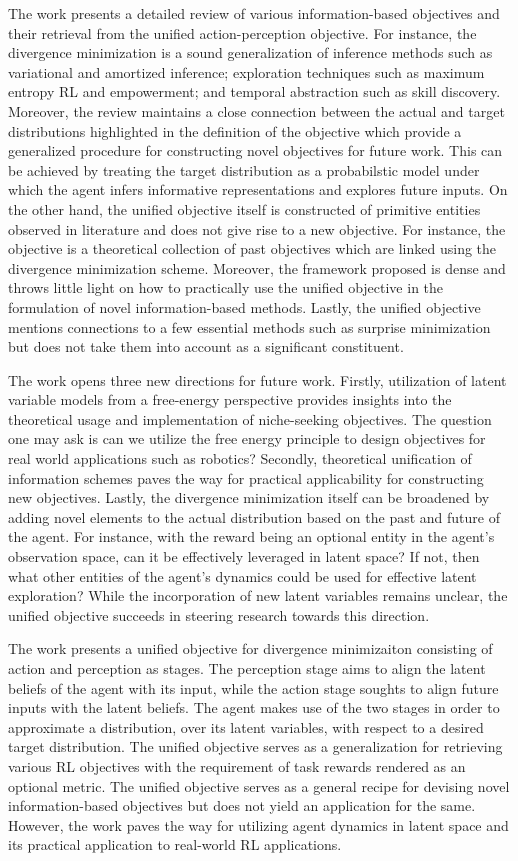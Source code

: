 \documentclass[10.5pt,letterpaper]{article}
\begin{document}
The work presents a detailed review of various information-based objectives and their retrieval from the unified action-perception objective. For instance, the divergence minimization is a sound generalization of inference methods such as variational and amortized inference; exploration techniques such as maximum entropy RL and empowerment; and temporal abstraction such as skill discovery. Moreover, the review maintains a close connection between the actual and target distributions highlighted in the definition of the objective which provide a generalized procedure for constructing novel objectives for future work. This can be achieved by treating the target distribution as a probabilstic model under which the agent infers informative representations and explores future inputs. On the other hand, the unified objective itself is constructed of primitive entities observed in literature and does not give rise to a new objective. For instance, the objective is a theoretical collection of past objectives which are linked using the divergence minimization scheme. Moreover, the framework proposed is dense and throws little light on how to practically use the unified objective in the formulation of novel information-based methods. Lastly, the unified objective mentions connections to a few essential methods such as surprise minimization but does not take them into account as a significant constituent.

The work opens three new directions for future work. Firstly, utilization of latent variable models from a free-energy perspective provides insights into the theoretical usage and implementation of niche-seeking objectives. The question one may ask is can we utilize the free energy principle to design objectives for real world applications such as robotics? Secondly, theoretical unification of information schemes paves the way for practical applicability for constructing new objectives. Lastly, the divergence minimization itself can be broadened by adding novel elements to the actual distribution based on the past and future of the agent. For instance, with the reward being an optional entity in the agent's observation space, can it be effectively leveraged in latent space? If not, then what other entities of the agent's dynamics could be used for effective latent exploration? While the incorporation of new latent variables remains unclear, the unified objective succeeds in steering research towards this direction.

The work presents a unified objective for divergence minimizaiton consisting of action and perception as stages. The perception stage aims to align the latent beliefs of the agent with its input, while the action stage soughts to align future inputs with the latent beliefs. The agent makes use of the two stages in order to approximate a distribution, over its latent variables, with respect to a desired target distribution. The unified objective serves as a generalization for retrieving various RL objectives with the requirement of task rewards rendered as an optional metric. The unified objective serves as a general recipe for devising novel information-based objectives but does not yield an application for the same. However, the work paves the way for utilizing agent dynamics in latent space and its practical application to real-world RL applications.   
\end{document}
